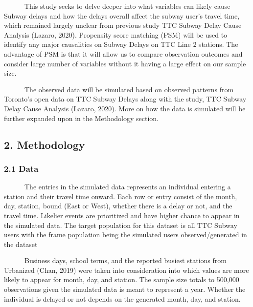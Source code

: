 \documentclass[
]{article}
\begin{document}
~~~~~~This study seeks to delve deeper into what variables can likely
cause Subway delays and how the delays overall affect the subway user's
travel time, which remained largely unclear from previous study TTC
Subway Delay Cause Analysis (Lazaro, 2020). Propensity score matching
(PSM) will be used to identify any major causalities on Subway Delays on
TTC Line 2 stations. The advantage of PSM is that it will allow us to
compare observation outcomes and consider large number of variables
without it having a large effect on our sample size.

~~~~~~The observed data will be simulated based on observed patterns
from Toronto's open data on TTC Subway Delays along with the study, TTC
Subway Delay Cause Analysis (Lazaro, 2020). More on how the data is
simulated will be further expanded upon in the Methodology section.

\hypertarget{methodology}{%
\subsection{2. Methodology}\label{methodology}}

\hypertarget{data}{%
\subsubsection{2.1 Data}\label{data}}

~~~~~~The entries in the simulated data represents an individual
entering a station and their travel time onward. Each row or entry
consist of the month, day, station, bound (East or West), whether there
is a delay or not, and the travel time. Likelier events are prioritized
and have higher chance to appear in the simulated data. The target
population for this dataset is all TTC Subway users with the frame
population being the simulated users observed/generated in the dataset

~~~~~~Business days, school terms, and the reported busiest stations
from Urbanized (Chan, 2019) were taken into consideration into which
values are more likely to appear for month, day, and station. The sample
size totals to 500,000 observations given the simulated data is meant to
represent a year. Whether the individual is delayed or not depends on
the generated month, day, and station.
\end{document}
